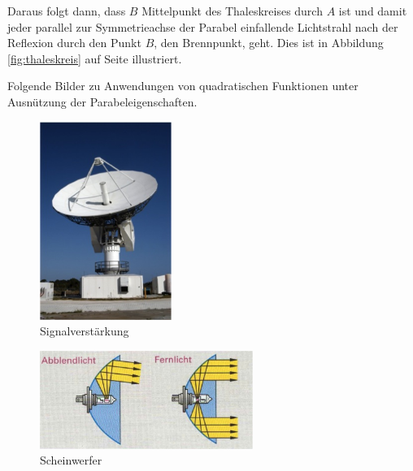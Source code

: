 \documentclass[%
<<<<<<< Updated upstream
11pt,%
twoside,%
titlepage,%
german,%
=======
11pt,%
twoside,%
titlepage,%
swissgerman,%
>>>>>>> Stashed changes
headsepline%
]{scrartcl}
\theoremstyle{definition}
\theoremstyle{plain}
\begin{document}
Daraus folgt dann, dass $B$ Mittelpunkt des Thaleskreises durch $A$ ist und damit jeder parallel zur Symmetrieachse der Parabel einfallende Lichtstrahl nach der Reflexion durch den Punkt $B$, den Brennpunkt, geht. Dies ist in Abbildung \ref{fig:thaleskreis} auf Seite \pageref{fig:thaleskreis} illustriert.

Folgende Bilder zu Anwendungen von quadratischen Funktionen unter Ausn\"utzung der Parabeleigenschaften.

\begin{figure}
\centering
\includegraphics[width=0.382\textwidth]{pictures/radar}
\caption{Signalverst\"arkung}
\end{figure}

\begin{figure}
\centering
\includegraphics[width=0.618\textwidth]{pictures/scheinwerfer}
\caption{Scheinwerfer}
\end{figure}

\pagebreak
\end{document}

